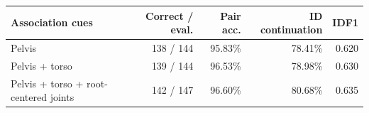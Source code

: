 \begin{tabular}{lrrrr}
  \toprule
  Association cues & Correct / eval. & Pair acc. & ID continuation & IDF1 \\
  \midrule
  Pelvis & 138 / 144 & 95.83\% & 78.41\% & 0.620 \\
  Pelvis + torso & 139 / 144 & 96.53\% & 78.98\% & 0.630 \\
  Pelvis + torso + root-centered joints & 142 / 147 & 96.60\% & 80.68\% & 0.635 \\
  \bottomrule
\end{tabular}
